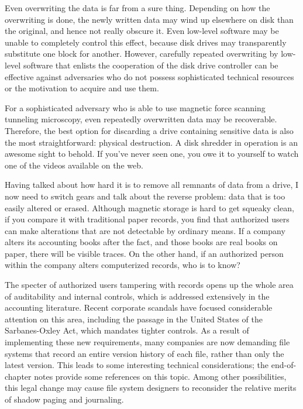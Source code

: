 Even overwriting
the data is far from a sure thing.  Depending on how the overwriting
is done, the newly written data may wind up elsewhere on disk than the
original, and hence not really obscure it.  Even low-level software
may be unable to completely control this effect, because disk drives may
transparently substitute one block for another.  However, carefully repeated
overwriting by low-level software that enlists the cooperation of the
disk drive controller can be effective against adversaries who do not
possess sophisticated technical resources or the motivation to
acquire and use them.

For a sophisticated adversary who is able to use magnetic force scanning
tunneling microscopy, even repeatedly overwritten data may be
recoverable.  Therefore, the best option for discarding a drive
containing sensitive data is also the most straightforward: physical
destruction.  A disk shredder in operation is an awesome sight to behold.
If you've never seen one, you owe it to yourself to watch one of the videos
available on the web.

Having talked about how hard it is to remove all remnants of data from
a drive, I now need to switch gears and talk about the reverse
problem: data that is too easily altered or erased. Although magnetic
storage is hard to get squeaky clean, if you compare it with
traditional paper records, you find that authorized users can make
alterations that are not detectable by ordinary means.  If a company
alters its accounting books after the fact, and those books are real
books on paper, there will be visible traces.  On the other hand, if
an authorized person within the company alters computerized records,
who is to know?

The specter of authorized users tampering with records opens up the
whole area of auditability and internal controls,
which is addressed extensively in the accounting literature.  Recent
corporate scandals have focused considerable attention on this area,
including the passage in the United States of the Sarbanes-Oxley Act,
which mandates tighter controls.  As a result of implementing these new
requirements, many companies are now demanding file systems that
record an entire version history of each file, rather than only the
latest version.  This leads to some interesting technical
considerations; the end-of-chapter notes provide some references on
this topic.  Among other possibilities, this legal change may cause
file system designers to reconsider the relative merits of shadow
paging and journaling.

